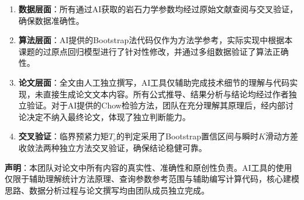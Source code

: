 \documentclass[12pt,a4paper]{article}
\begin{document}
\begin{enumerate}
    \item \textbf{数据层面}：所有通过AI获取的岩石力学参数均经过原始文献查阅与交叉验证，确保数据准确性。
    
    \item \textbf{算法层面}：AI提供的Bootstrap法代码仅作为方法学参考，实际实现中根据本课题的过原点回归模型进行了针对性修改，并通过多组数据验证了算法正确性。
    
    \item \textbf{论文层面}：全文由人工独立撰写，AI工具仅辅助完成技术细节的理解与代码实现，未直接生成论文文本内容。所有公式推导、结果分析与结论均经过作者独立验证。对于AI提供的Chow检验方法，团队在充分理解其原理后，经内部讨论决定不纳入最终论文，体现了独立判断能力。
    
    \item \textbf{交叉验证}：临界预紧力矩$T_c$的判定采用了Bootstrap置信区间与瞬时$K$滑动方差收敛法两种独立方法交叉验证，确保结论稳健可靠。
\end{enumerate}

\vspace{1em}
\noindent\textbf{声明}：本团队对论文中所有内容的真实性、准确性和原创性负责。AI工具的使用仅限于辅助理解统计方法原理、查询参数参考范围与辅助编写计算代码，核心建模思路、数据分析过程与论文撰写均由团队成员独立完成。
\end{document}
